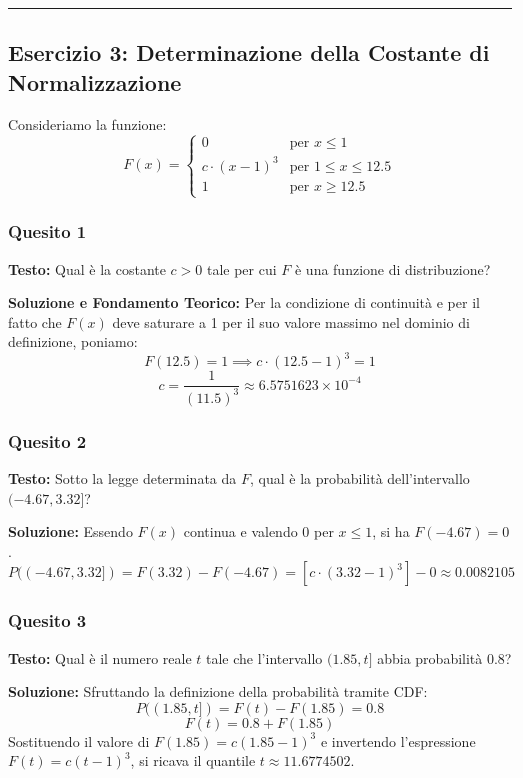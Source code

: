 \documentclass[12pt, a4paper]{article}
\begin{document}
\vspace{0.5cm}\hrule\vspace{0.5cm}

\subsection*{Esercizio 3: Determinazione della Costante di Normalizzazione}
Consideriamo la funzione:
$$
F(x) = 
\begin{cases} 
0 & \text{per } x \le 1 \\
c \cdot (x-1)^3 & \text{per } 1 \le x \le 12.5 \\
1 & \text{per } x \ge 12.5
\end{cases}
$$

\subsubsection*{Quesito 1}
\textbf{Testo:} Qual è la costante $c>0$ tale per cui $F$ è una funzione di distribuzione?

\textbf{Soluzione e Fondamento Teorico:}
Per la condizione di continuità e per il fatto che $F(x)$ deve saturare a 1 per il suo valore massimo nel dominio di definizione, poniamo:
$$F(12.5) = 1 \implies c \cdot (12.5 - 1)^3 = 1$$
$$c = \frac{1}{(11.5)^3} \approx 6.5751623 \times 10^{-4}$$

\subsubsection*{Quesito 2}
\textbf{Testo:} Sotto la legge determinata da $F$, qual è la probabilità dell'intervallo $(-4.67, 3.32]$?

\textbf{Soluzione:}
Essendo $F(x)$ continua e valendo 0 per $x \le 1$, si ha $F(-4.67) = 0$.
$$P((-4.67, 3.32]) = F(3.32) - F(-4.67) = \left[ c \cdot (3.32 - 1)^3 \right] - 0 \approx 0.0082105$$

\subsubsection*{Quesito 3}
\textbf{Testo:} Qual è il numero reale $t$ tale che l'intervallo $(1.85, t]$ abbia probabilità 0.8?

\textbf{Soluzione:}
Sfruttando la definizione della probabilità tramite CDF:
$$P((1.85, t]) = F(t) - F(1.85) = 0.8$$
$$F(t) = 0.8 + F(1.85)$$
Sostituendo il valore di $F(1.85) = c(1.85 - 1)^3$ e invertendo l'espressione $F(t) = c(t-1)^3$, si ricava il quantile $t \approx 11.6774502$.
\end{document}
